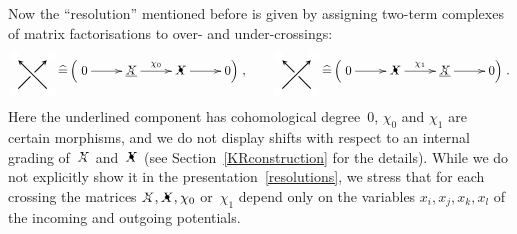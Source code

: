 \documentclass{compositio}
\theoremstyle{definition}
\numberwithin{equation}{section}
\begin{document}
Now the ``resolution''  mentioned before is given by assigning two-term complexes of matrix factorisations to over- and under-crossings: 
\begin{equation}
\label{resolutions}
\begin{tikzpicture}[scale=0.5,baseline, inner sep=1mm, >=stealth]
\node (0) at (0,0) [circle,inner sep=1.5pt, draw=white,fill= white] {};
\node (bl) at (-1,-1) [circle,draw=white,fill= white] {};
\node (br) at (1,-1) [circle,draw=white,fill= white] {};
\node (tl) at (-1,1) [circle,draw=white,fill= white] {};
\node (tr) at (1,1) [circle,draw=white,fill= white] {};
\draw[-, thick] (bl) -- (0); 
\draw[->, thick] (br) -- (tl); 
\draw[->, thick] (0) -- (tr); 
\end{tikzpicture}
\,\widehat =\,
\Big(
\xymatrix{%
0 \vphantom{\underline{X}} \ar[r] & \underline{\Xcirc} \ar[r]^{\chi_{0}} & \Xbul \vphantom{\underline{X}} \ar[r] & 0 \vphantom{\underline{X}} \Big) 
}
,  \qquad
\begin{tikzpicture}[scale=0.5,baseline, inner sep=1mm, >=stealth]
\node (0) at (0,0) [circle,inner sep=1.5pt, draw=white,fill= white] {};
\node (bl) at (-1,-1) [circle,draw=white,fill= white] {};
\node (br) at (1,-1) [circle,draw=white,fill= white] {};
\node (tl) at (-1,1) [circle,draw=white,fill= white] {};
\node (tr) at (1,1) [circle,draw=white,fill= white] {};
\draw[->, thick] (bl) -- (tr); 
\draw[-, thick] (br) -- (0); 
\draw[->, thick] (0) -- (tl); 
\end{tikzpicture}
\,\widehat =\,
\Big(
\xymatrix{%
0 \vphantom{\underline{X}} \ar[r] & \Xbul \vphantom{\underline{X}} \ar[r]^{\chi_{1}} & \underline{\Xcirc} \ar[r] & 0 \vphantom{\underline{X}} \Big) 
}
.
\end{equation}
Here the underlined component has cohomological degree~$0$, $\chi_{0}$ and $\chi_{1}$ are certain morphisms, and we do not display shifts with respect to an internal grading of~$\Xcirc$ and~$\Xbul$ (see Section~\ref{KRconstruction} for the details). While we do not explicitly show it in the presentation~\eqref{resolutions}, we stress that for each crossing the matrices $\Xcirc,\Xbul,\chi_{0}$ or~$\chi_{1}$ depend only on the variables $x_{i},x_{j},x_{k},x_{l}$ of the incoming and outgoing potentials. 
\end{document}
